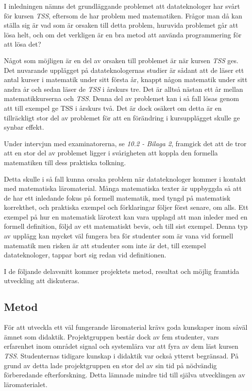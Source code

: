 \documentclass[]{article}
\begin{document}
I inledningen nämns det grundläggande problemet att datateknologer har
svårt för kursen \textit{TSS}, eftersom de har problem med
matematiken. Frågor man då kan ställa sig är vad som är orsaken till
detta problem, huruvida problemet går att lösa helt, och om det
verkligen är en bra metod att använda programmering för att lösa det?

Något som möjligen är en del av orsaken till problemet är när kursen
\textit{TSS} ges. Det nuvarande upplägget på datateknologernas studier
är sådant att de läser ett antal kurser i matematik under sitt första
år, knappt någon matematik under sitt andra år och sedan läser de
\textit{TSS} i årskurs tre. Det är alltså nästan ett år mellan
matematikkurserna och \textit{TSS}. Denna del av problemet kan i så
fall lösas genom att till exempel ge TSS i årskurs två. Det är dock
osäkert om detta är en tillräckligt stor del av problemet för att en
förändring i kursupplägget skulle ge synbar effekt.

Under intervjun med examinatorerna, se \textit{10.2 - Bilaga 2}, framgick det
att de tror att en stor del av problemet ligger i svårigheten att
koppla den formella matematiken till dess praktiska tolkning.

Detta skulle i så fall kunna orsaka problem när datateknologer kommer
i kontakt med matematiska läromaterial. Många matematiska texter är
uppbyggda så att de har ett inledande fokus på formell matematik, med
tyngd på matematisk korrekthet, och praktiska exempel och förklaringar
följer först senare, om alls. Ett exempel på hur en matematisk
lärotext kan vara upplagd att man inleder med en formell definition,
följd av ett matematiskt bevis, och till sist exempel. Denna typ av
upplägg kan mycket väl fungera bra för studenter som är vana vid
formell matematik men risken är att studenter som inte är det, till
exempel datateknologer, tappar bort sig redan vid definitionen.

I de följande delavsnitt kommer projektets metod, resultat och möjlig
framtida utveckling att diskuteras.

\subsection{Metod}
För att utveckla ett väl fungerande läromaterial krävs goda kunskaper
inom såväl ämnet som didaktik. Projektgruppen består dock av fem studenter, vars erfarenhet
inom området signal och systemlära var att fyra av dem läst kursen
\textit{TSS}. Studenternas tidigare kunskap i didaktik var också
ytterst begränsad. På grund av detta lade projekt\-gruppen en stor del
av sin tid på nödvändig förberedande efterforskning. Detta lämnade
mindre tid till själva utvecklingen av läromaterialet.
\end{document}
